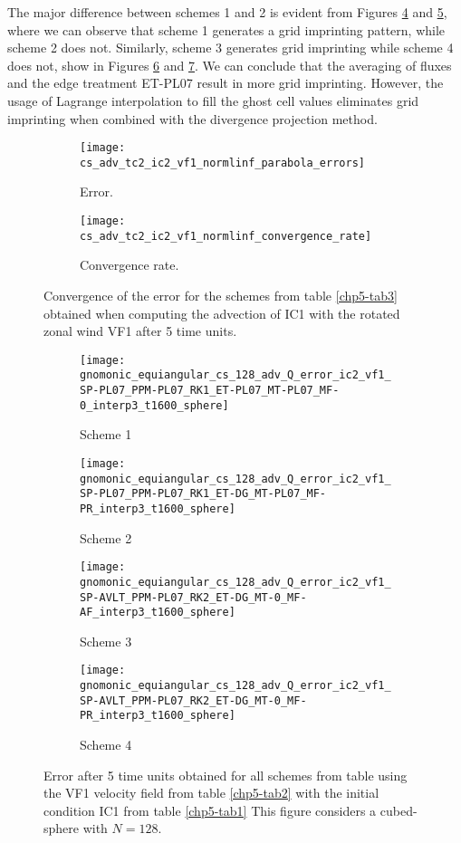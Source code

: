 The major difference between schemes 1 and 2 is evident from Figures \ref{chp5-adv1-s1} and
\ref{chp5-adv1-s2}, where we can observe that scheme 1 generates a grid imprinting pattern, 
while scheme 2 does not.
Similarly, scheme 3 generates grid imprinting while scheme 4 does not, 
show in Figures \ref{chp5-adv1-s3} and \ref{chp5-adv1-s4}.
We can conclude that the averaging of fluxes and the edge treatment ET-PL07 
result in more grid imprinting. However, the usage of Lagrange interpolation to fill the 
ghost cell values eliminates grid imprinting when combined with the divergence projection 
method.


\begin{figure}[!htb]
	\centering
	\begin{subfigure}{0.42\textwidth}
		\centering
		\texttt{[image: cs\_adv\_tc2\_ic2\_vf1\_normlinf\_parabola\_errors]}
		\caption{Error.\label{chp5-adv1-error}}
	\end{subfigure}
	\begin{subfigure}{0.42\textwidth}
		\centering
		\texttt{[image: cs\_adv\_tc2\_ic2\_vf1\_normlinf\_convergence\_rate]}
		\caption{Convergence rate.\label{chp5-adv1-cr}}
	\end{subfigure}
	\caption{Convergence of the error for the schemes from table \ref{chp5-tab3} obtained when computing the advection of IC1  with the rotated zonal wind VF1 after 5 time units.
	\label{chp5-error-adv1}}
\end{figure}

\begin{figure}[!htb]
	\centering
	\begin{subfigure}{0.4\textwidth}
		\centering
		\texttt{[image: gnomonic\_equiangular\_cs\_128\_adv\_Q\_error\_ic2\_vf1\_SP-PL07\_PPM-PL07\_RK1\_ET-PL07\_MT-PL07\_MF-0\_interp3\_t1600\_sphere]}
		\caption{Scheme 1 \label{chp5-adv1-s1}}
	\end{subfigure}
	\begin{subfigure}{0.4\textwidth}
		\centering
		\texttt{[image: gnomonic\_equiangular\_cs\_128\_adv\_Q\_error\_ic2\_vf1\_SP-PL07\_PPM-PL07\_RK1\_ET-DG\_MT-PL07\_MF-PR\_interp3\_t1600\_sphere]}
		\caption{Scheme 2 \label{chp5-adv1-s2}}
	\end{subfigure}

	\begin{subfigure}{0.4\textwidth}
	\centering
	\texttt{[image: gnomonic\_equiangular\_cs\_128\_adv\_Q\_error\_ic2\_vf1\_SP-AVLT\_PPM-PL07\_RK2\_ET-DG\_MT-0\_MF-AF\_interp3\_t1600\_sphere]}
	\caption{Scheme 3 \label{chp5-adv1-s3}}
\end{subfigure}
\begin{subfigure}{0.4\textwidth}
	\centering
	\texttt{[image: gnomonic\_equiangular\_cs\_128\_adv\_Q\_error\_ic2\_vf1\_SP-AVLT\_PPM-PL07\_RK2\_ET-DG\_MT-0\_MF-PR\_interp3\_t1600\_sphere]}
	\caption{Scheme 4 \label{chp5-adv1-s4}}
\end{subfigure}
	\caption{ Error after 5 time units obtained for all schemes from table using the VF1 velocity field from table \ref{chp5-tab2} with the initial condition IC1 from  table \ref{chp5-tab1} 
	This figure considers a cubed-sphere with $N=128$. \label{chp5-adv1}}
\end{figure}


